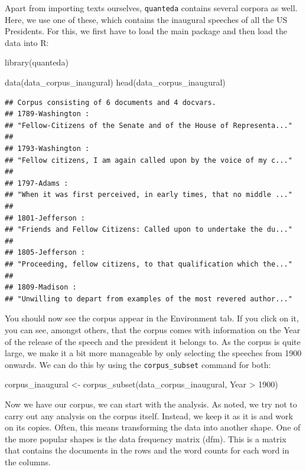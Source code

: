 \documentclass[
]{article}
\newenvironment{Shaded}{\begin{snugshade}}{\end{snugshade}}
\newcommand{\DecValTok}[1]{\textcolor[rgb]{0.00,0.00,0.81}{#1}}
\newcommand{\FunctionTok}[1]{\textcolor[rgb]{0.00,0.00,0.00}{#1}}
\newcommand{\NormalTok}[1]{#1}
\newcommand{\OtherTok}[1]{\textcolor[rgb]{0.56,0.35,0.01}{#1}}
\newcommand{\SpecialCharTok}[1]{\textcolor[rgb]{0.00,0.00,0.00}{#1}}
\begin{document}
Apart from importing texts ourselves, \texttt{quanteda} contains several corpora as well. Here, we use one of these, which contains the inaugural speeches of all the US Presidents. For this, we first have to load the main package and then load the data into R:

\begin{Shaded}
\begin{Highlighting}[]
\FunctionTok{library}\NormalTok{(quanteda)}

\FunctionTok{data}\NormalTok{(data\_corpus\_inaugural)}
\FunctionTok{head}\NormalTok{(data\_corpus\_inaugural)}
\end{Highlighting}
\end{Shaded}

\begin{verbatim}
## Corpus consisting of 6 documents and 4 docvars.
## 1789-Washington :
## "Fellow-Citizens of the Senate and of the House of Representa..."
## 
## 1793-Washington :
## "Fellow citizens, I am again called upon by the voice of my c..."
## 
## 1797-Adams :
## "When it was first perceived, in early times, that no middle ..."
## 
## 1801-Jefferson :
## "Friends and Fellow Citizens: Called upon to undertake the du..."
## 
## 1805-Jefferson :
## "Proceeding, fellow citizens, to that qualification which the..."
## 
## 1809-Madison :
## "Unwilling to depart from examples of the most revered author..."
\end{verbatim}

You should now see the corpus appear in the Environment tab. If you click on it, you can see, amongst others, that the corpus comes with information on the Year of the release of the speech and the president it belongs to. As the corpus is quite large, we make it a bit more manageable by only selecting the speeches from 1900 onwards. We can do this by using the \texttt{corpus\_subset} command for both:

\begin{Shaded}
\begin{Highlighting}[]
\NormalTok{corpus\_inaugural }\OtherTok{\textless{}{-}} \FunctionTok{corpus\_subset}\NormalTok{(data\_corpus\_inaugural, Year }\SpecialCharTok{\textgreater{}} \DecValTok{1900}\NormalTok{)}
\end{Highlighting}
\end{Shaded}

Now we have our corpus, we can start with the analysis. As noted, we try not to carry out any analysis on the corpus itself. Instead, we keep it as it is and work on its copies. Often, this means transforming the data into another shape. One of the more popular shapes is the data frequency matrix (dfm). This is a matrix that contains the documents in the rows and the word counts for each word in the columns.
\end{document}
